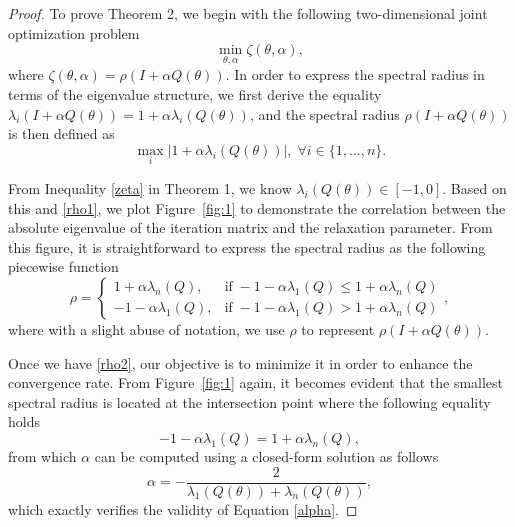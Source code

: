 \documentclass[letterpaper]{article} %
\begin{document}
\begin{proof} To prove Theorem 2, we begin with the following two-dimensional joint optimization problem
\begin{equation}\label{joint}
	\min_{\theta, \alpha} \zeta\left(\theta, \alpha \right),
\end{equation}
where $\zeta\left(\theta, \alpha \right)=\rho(I+\alpha Q(\theta))$. In order to express the spectral radius in terms of the eigenvalue structure, we first derive the equality $ \lambda_i \left(I+\alpha Q(\theta)\right) = 1 + \alpha \lambda_i\left(Q(\theta)\right)$, and the spectral radius $\rho(I+\alpha Q(\theta))$ is then defined as 
\begin{equation}\label{rho1}
  \max_i |1 + \alpha \lambda_i\left(Q(\theta)\right)|,\; \forall i \in \{1,...,n\}. 
\end{equation}

From Inequality \eqref{zeta} in Theorem 1, we know $\lambda_i\left(Q(\theta)\right) \in [-1,0]$. Based on this and \eqref{rho1}, we plot Figure~\ref{fig:1} to demonstrate the correlation between the absolute eigenvalue of the iteration matrix and the relaxation parameter. From this figure, it is straightforward to express the spectral radius as the following piecewise function
\begin{equation}\label{rho2}
	\rho= 
	\begin{cases}
		1+\alpha \lambda_n (Q), & \text{if}\;-1 - \alpha \lambda_1(Q)\leq 1 + \alpha \lambda_n(Q)\\
		-1-\alpha \lambda_1 (Q), & \text{if}\;-1 - \alpha \lambda_1(Q) > 1 + \alpha \lambda_n(Q)
	\end{cases},
\end{equation}
where with a slight abuse of notation, we use $\rho $ to represent $\rho(I+\alpha Q(\theta))$. 

Once we have \eqref{rho2}, our objective is to minimize it in order to enhance the convergence rate. From Figure~\ref{fig:1} again, it becomes evident that the smallest spectral radius is located at the intersection point where the following equality holds 
\begin{equation*}
    -1 - \alpha \lambda_1(Q) = 1 + \alpha \lambda_n(Q),
\end{equation*}
from which $\alpha$ can be computed using a closed-form solution as follows
\begin{equation*}
  \alpha = -\frac{2}{\lambda_1\left(Q\left(\theta\right)\right)+\lambda_n\left(Q\left(\theta\right)\right)},
\end{equation*}
which exactly verifies the validity of Equation \eqref{alpha}. 
\end{proof}
\end{document}
